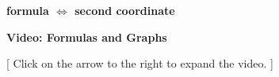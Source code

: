 \documentclass{ximera}
\begin{document}
\begin{center}
\textbf{\textcolor{purple!85!blue}{formula $\iff$ second coordinate}}
\end{center}






\begin{explanation} \textbf{Video: Formulas and Graphs}

[ Click on the arrow to the right to expand the video. ]
\begin{expandable} 

\begin{center}
\end{center}

\end{expandable}
\end{explanation}
\end{document}
